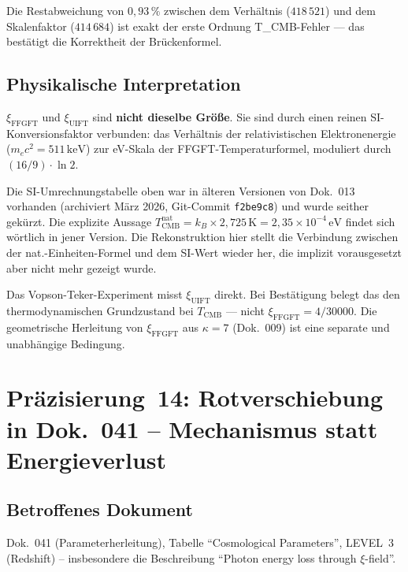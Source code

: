 Die Restabweichung von $0{,}93\,\%$ zwischen dem Verhältnis ($418\,521$) und dem
Skalenfaktor ($414\,684$) ist exakt der erste Ordnung T\_CMB-Fehler — das
bestätigt die Korrektheit der Brückenformel.

\subsection*{Physikalische Interpretation}

$\xi_\text{FFGFT}$ und $\xi_\text{UIFT}$ sind \textbf{nicht dieselbe Größe}.
Sie sind durch einen reinen SI-Konversionsfaktor verbunden: das Verhältnis der
relativistischen Elektronenergie ($m_ec^2 = 511\,\text{keV}$) zur eV-Skala der
FFGFT-Temperaturformel, moduliert durch $(16/9)\cdot\ln 2$.

Die SI-Umrechnungstabelle oben war in älteren Versionen von Dok.~013 vorhanden
(archiviert März 2026, Git-Commit \texttt{f2be9c8}) und wurde seither gekürzt.
Die explizite Aussage
$T_\text{CMB}^\text{nat} = k_B \times 2{,}725\,\text{K} = 2{,}35\times10^{-4}\,\text{eV}$
findet sich wörtlich in jener Version. Die Rekonstruktion hier stellt die
Verbindung zwischen der nat.-Einheiten-Formel und dem SI-Wert wieder her,
die implizit vorausgesetzt aber nicht mehr gezeigt wurde.

Das Vopson-Teker-Experiment misst $\xi_\text{UIFT}$ direkt.
Bei Bestätigung belegt das den thermodynamischen Grundzustand bei $T_\text{CMB}$ —
nicht $\xi_\text{FFGFT} = 4/30000$.
Die geometrische Herleitung von $\xi_\text{FFGFT}$ aus $\kappa = 7$ (Dok.~009)
ist eine separate und unabhängige Bedingung.


\section{\texorpdfstring{Präzisierung~14: Rotverschiebung in Dok.~041 -- Mechanismus statt Energieverlust}{Praezisierung 14: Rotverschiebung in Dok. 041 -- Mechanismus statt Energieverlust}}

\subsection*{Betroffenes Dokument}

Dok.~041 (Parameterherleitung), Tabelle \enquote{Cosmological Parameters},
LEVEL~3 (Redshift) -- insbesondere die Beschreibung
\enquote{Photon energy loss through $\xi$-field}.

